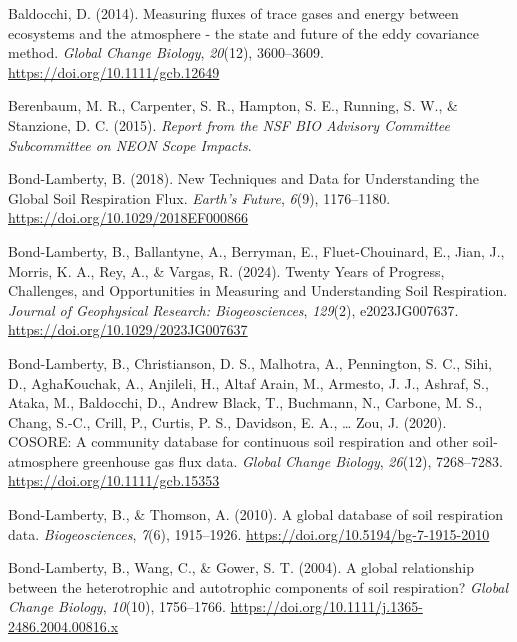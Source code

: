 \documentclass[
  letterpaper,
  DIV=11,
  numbers=noendperiod]{scrartcl}
\newlength{\cslhangindent}
\newenvironment{CSLReferences}[2] %
 {\begin{list}{}{%
  \setlength{\itemindent}{0pt}
  \setlength{\leftmargin}{0pt}
  \setlength{\parsep}{0pt}
  \ifodd #1
   \setlength{\leftmargin}{\cslhangindent}
   \setlength{\itemindent}{-1\cslhangindent}
  \fi
  \setlength{\itemsep}{#2\baselineskip}}}
 {\end{list}}
\begin{document}
\label{refs}
\begin{CSLReferences}{1}{0}
Baldocchi, D. (2014). Measuring fluxes of trace gases and energy between
ecosystems and the atmosphere - the state and future of the eddy
covariance method. \emph{Global Change Biology}, \emph{20}(12),
3600--3609. \url{https://doi.org/10.1111/gcb.12649}

Berenbaum, M. R., Carpenter, S. R., Hampton, S. E., Running, S. W., \&
Stanzione, D. C. (2015). \emph{Report from the {NSF BIO Advisory
Committee Subcommittee} on {NEON Scope Impacts}}.

Bond-Lamberty, B. (2018). New {Techniques} and {Data} for
{Understanding} the {Global Soil Respiration Flux}. \emph{Earth's
Future}, \emph{6}(9), 1176--1180.
\url{https://doi.org/10.1029/2018EF000866}

Bond-Lamberty, B., Ballantyne, A., Berryman, E., Fluet-Chouinard, E.,
Jian, J., Morris, K. A., Rey, A., \& Vargas, R. (2024). Twenty {Years}
of {Progress}, {Challenges}, and {Opportunities} in {Measuring} and
{Understanding Soil Respiration}. \emph{Journal of Geophysical Research:
Biogeosciences}, \emph{129}(2), e2023JG007637.
\url{https://doi.org/10.1029/2023JG007637}

Bond-Lamberty, B., Christianson, D. S., Malhotra, A., Pennington, S. C.,
Sihi, D., AghaKouchak, A., Anjileli, H., Altaf Arain, M., Armesto, J.
J., Ashraf, S., Ataka, M., Baldocchi, D., Andrew Black, T., Buchmann,
N., Carbone, M. S., Chang, S.-C., Crill, P., Curtis, P. S., Davidson, E.
A., \ldots{} Zou, J. (2020). {COSORE}: {A} community database for
continuous soil respiration and other soil-atmosphere greenhouse gas
flux data. \emph{Global Change Biology}, \emph{26}(12), 7268--7283.
\url{https://doi.org/10.1111/gcb.15353}

Bond-Lamberty, B., \& Thomson, A. (2010). A global database of soil
respiration data. \emph{Biogeosciences}, \emph{7}(6), 1915--1926.
\url{https://doi.org/10.5194/bg-7-1915-2010}

Bond-Lamberty, B., Wang, C., \& Gower, S. T. (2004). A global
relationship between the heterotrophic and autotrophic components of
soil respiration? \emph{Global Change Biology}, \emph{10}(10),
1756--1766. \url{https://doi.org/10.1111/j.1365-2486.2004.00816.x}


\end{CSLReferences}
\end{document}
